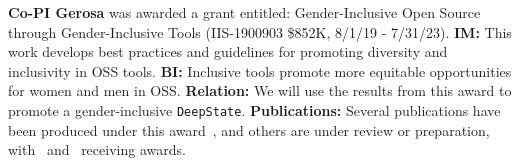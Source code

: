 \documentclass[numbers]{proposalnsf}
\newcommand{\ds}{\texttt{DeepState}}
\begin{document}
\textbf{Co-PI Gerosa} was awarded a grant entitled: Gender-Inclusive Open Source through Gender-Inclusive Tools (IIS-1900903 \$852K, 8/1/19 - 7/31/23). 
\textbf{IM:} This work develops best practices and guidelines for promoting diversity and inclusivity in OSS tools. 
\textbf{BI:} Inclusive tools promote more equitable opportunities for women and men in OSS. 
\textbf{Relation:} We will use the results from this award to promote a gender-inclusive  \ds.
\textbf{Publications:} Several publications have been produced under this award~\cite{balali2020recommending,dias2021makes,silva2020google,gerosa2021shifting,silva2020theory,trinkenreich2020hidden,chatterjee2021aid,mendez2019gendermag,stumpf2020gender,guizani2020gender,hilderbrand2020engineering,padala2020gender,wessel2020effects}, and others are under review or preparation, with~\cite{balali2020recommending} and~\cite{wessel2020effects} receiving awards. 


\newpage
%


\end{document}
